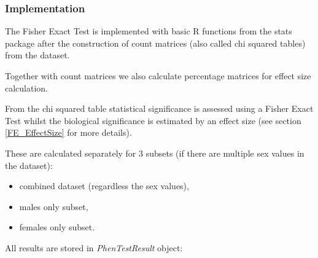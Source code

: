 \documentclass[12pt,a4paper]{article}
\begin{document}
\subsubsection{Implementation}
The Fisher Exact Test is implemented with basic R functions from the stats package after the construction of count matrices (also called chi squared tables) from the dataset. 

Together with count matrices we also calculate percentage matrices for effect size calculation.

From the chi squared table statistical significance is assessed using a Fisher Exact Test whilst the biological significance is estimated by an effect size (see section \ref{FE_EffectSize} for more details).

These are calculated separately for 3 subsets (if there are multiple sex values in the dataset):
\begin{itemize}
 \item combined dataset (regardless the sex values),
 \item males only subset,
 \item females only subset.
\end{itemize}

All results are stored in \textit{PhenTestResult} object:
\end{document}
